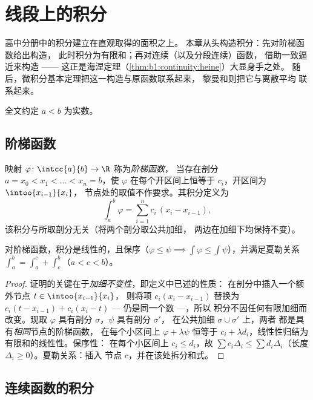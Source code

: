 \chapter{线段上的积分}\label{ch:b1:integration}

高中分册中的积分建立在直观取得的面积之上。
本章从头构造积分：先对阶梯函数给出构造，
此时积分为有限和；再对连续（以及分段连续）函数，
借助一致逼近来构造 ——
这正是海涅定理（\cref{thm:b1:continuity:heine}）大显身手之处。
随后，微积分基本定理把这一构造与原函数联系起来，
黎曼和则把它与离散平均
联系起来。

全文约定 $a < b$ 为实数。

\section{阶梯函数}

\begin{definition}\label{def:b1:integration:step}
映射 $\varphi \colon \intcc{a}{b} \to \R$ 称为\emph{阶梯函数}，
当存在剖分 $a = x_0
< x_1 < \dots < x_n = b$，使 $\varphi$ 在每个开区间上恒等于
$c_i$，开区间为 $\intoo{x_{i-1}}{x_i}$，
节点处的取值不作要求。其积分定义为
\[
\int_a^b \varphi = \sum_{i=1}^{n} c_i\,(x_i - x_{i-1}),
\]
该积分与所取剖分无关（将两个剖分取公共加细，
两边在加细下均保持不变）。
\end{definition}

\begin{proposition}\label{prop:b1:integration:stepprops}
对阶梯函数，积分是线性的，且保序（$\varphi \leq
\psi \implies \int\varphi \leq \int\psi$），并满足夏勒关系
$\int_a^b = \int_a^c + \int_c^b$（$a < c < b$）。
\end{proposition}

\begin{proof}
证明的关键在于\emph{加细不变性}，即定义中已述的性质：
在剖分中插入一个额外节点 $t \in \intoo{x_{i-1}}{x_i}$，
则将项 $c_i(x_i - x_{i-1})$ 替换为
$c_i(t - x_{i-1}) + c_i(x_i - t)$ --- 仍是同一个数 ---，所以
积分不因任何有限加细而改变。现取
$\varphi$ 具有剖分 $\sigma$，$\psi$ 具有剖分 $\sigma'$，
在公共加细 $\sigma \cup \sigma'$ 上，两者
都是具有\emph{相同}节点的阶梯函数，
在每个小区间上 $\varphi + \lambda\psi$ 恒等于 $c_i + \lambda
d_i$，线性性归结为有限和的线性性。保序性：
在每个小区间上 $c_i \leq d_i$，故 $\sum c_i \Delta_i \leq \sum
d_i \Delta_i$（长度 $\Delta_i \geq 0$）。夏勒关系：插入
节点 $c$，并在该处拆分和式。
\end{proof}

\section{连续函数的积分}


